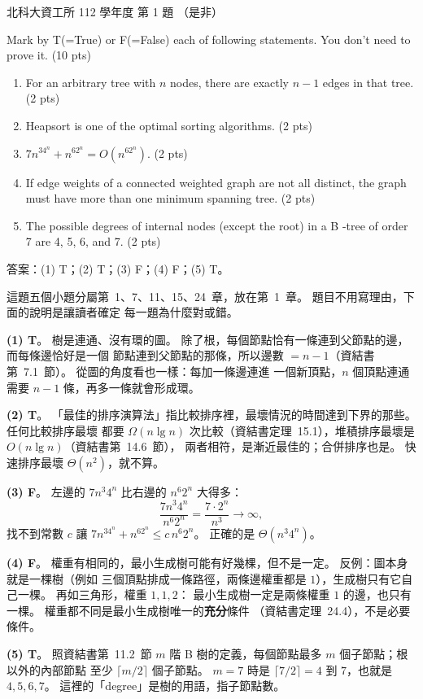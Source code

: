 \begin{pastexam}[label={px:ntut-112-ci-01}]{北科大資工所 112 學年度 第 1 題}
（是非）

Mark by T(=True) or F(=False) each of following statements. You don't need to prove it. (10 pts)
\begin{enumerate}[label=(\arabic*)]
\item For an arbitrary tree with $n$ nodes, there are exactly $n-1$ edges in that tree. (2 pts)
\item Heapsort is one of the optimal sorting algorithms. (2 pts)
\item $7n^34^n+n^62^n=O(n^62^n)$. (2 pts)
\item If edge weights of a connected weighted graph are not all distinct, the graph must have more than one minimum spanning tree. (2 pts)
\item The possible degrees of internal nodes (except the root) in a B -tree of order 7 are 4, 5, 6, and 7. (2 pts)
\end{enumerate}
\end{pastexam}

\begin{pastsoln}
答案：(1) T；(2) T；(3) F；(4) F；(5) T。

這題五個小題分屬第~1、7、11、15、24~章，放在第~1~章。 題目不用寫理由，下面的說明是讓讀者確定
每一題為什麼對或錯。

\textbf{(1) T}。 樹是連通、沒有環的圖。 除了根，每個節點恰有一條連到父節點的邊，而每條邊恰好是一個
節點連到父節點的那條，所以邊數 $= n - 1$（資結書第~7.1~節）。 從圖的角度看也一樣：每加一條邊連進
一個新頂點，$n$ 個頂點連通需要 $n - 1$ 條，再多一條就會形成環。

\textbf{(2) T}。 「最佳的排序演算法」指比較排序裡，最壞情況的時間達到下界的那些。 任何比較排序最壞
都要 $\Omega(n \lg n)$ 次比較（資結書定理~15.1），堆積排序最壞是 $O(n \lg n)$（資結書第~14.6~節），
兩者相符，是漸近最佳的；合併排序也是。 快速排序最壞 $\Theta(n^2)$，就不算。

\textbf{(3) F}。 左邊的 $7n^3 4^n$ 比右邊的 $n^6 2^n$ 大得多：
\[
\frac{7n^3 4^n}{n^6 2^n} = \frac{7 \cdot 2^n}{n^3} \to \infty,
\]
找不到常數 $c$ 讓 $7n^34^n + n^62^n \le c\, n^6 2^n$。 正確的是 $\Theta(n^3 4^n)$。

\textbf{(4) F}。 權重有相同的，最小生成樹可能有好幾棵，但不是一定。 反例：圖本身就是一棵樹（例如
三個頂點排成一條路徑，兩條邊權重都是 $1$），生成樹只有它自己一棵。 再如三角形，權重 $1, 1, 2$：
最小生成樹一定是兩條權重 $1$ 的邊，也只有一棵。 權重都不同是最小生成樹唯一的\textbf{充分}條件
（資結書定理~24.4），不是必要條件。

\textbf{(5) T}。 照資結書第~11.2~節 $m$ 階 B 樹的定義，每個節點最多 $m$ 個子節點；根以外的內部節點
至少 $\lceil m/2 \rceil$ 個子節點。 $m = 7$ 時是 $\lceil 7/2 \rceil = 4$ 到 $7$，也就是 $4, 5, 6, 7$。
這裡的「degree」是樹的用語，指子節點數。
\end{pastsoln}
